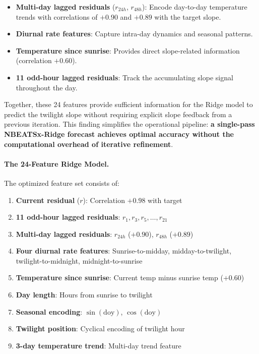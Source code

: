 \documentclass[11pt]{article}
\begin{document}
\begin{itemize}
    \item \textbf{Multi-day lagged residuals} ($r_{24h}$, $r_{48h}$): Encode day-to-day temperature trends with correlations of $+0.90$ and $+0.89$ with the target slope.
    \item \textbf{Diurnal rate features}: Capture intra-day dynamics and seasonal patterns.
    \item \textbf{Temperature since sunrise}: Provides direct slope-related information (correlation $+0.60$).
    \item \textbf{11 odd-hour lagged residuals}: Track the accumulating slope signal throughout the day.
\end{itemize}

Together, these 24 features provide sufficient information for the Ridge model to predict the twilight slope without requiring explicit slope feedback from a previous iteration. This finding simplifies the operational pipeline: \textbf{a single-pass NBEATSx-Ridge forecast achieves optimal accuracy without the computational overhead of iterative refinement}.

\paragraph{The 24-Feature Ridge Model.}
The optimized feature set consists of:
\begin{enumerate}
    \item \textbf{Current residual} ($r$): Correlation $+0.98$ with target
    \item \textbf{11 odd-hour lagged residuals}: $r_1, r_3, r_5, \ldots, r_{21}$
    \item \textbf{Multi-day lagged residuals}: $r_{24h}$ ($+0.90$), $r_{48h}$ ($+0.89$)
    \item \textbf{Four diurnal rate features}: Sunrise-to-midday, midday-to-twilight, twilight-to-midnight, midnight-to-sunrise
    \item \textbf{Temperature since sunrise}: Current temp minus sunrise temp ($+0.60$)
    \item \textbf{Day length}: Hours from sunrise to twilight
    \item \textbf{Seasonal encoding}: $\sin(\text{doy})$, $\cos(\text{doy})$
    \item \textbf{Twilight position}: Cyclical encoding of twilight hour
    \item \textbf{3-day temperature trend}: Multi-day trend feature
\end{enumerate}
\end{document}
